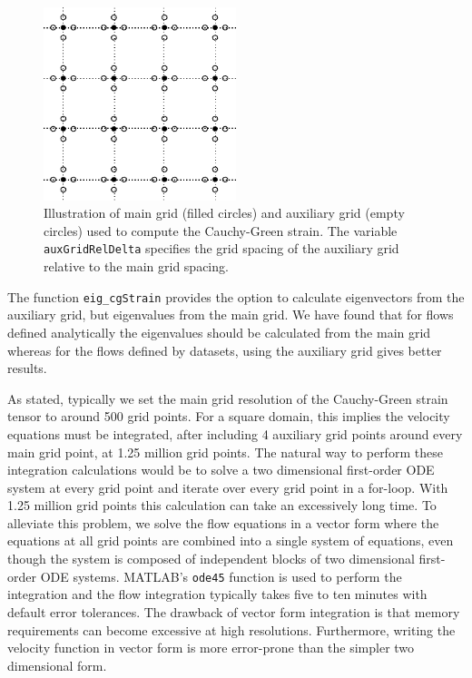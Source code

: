 \documentclass{article}
\begin{document}
\begin{figure}
\begin{center}
\includegraphics[width=0.5\textwidth]{graphics/main_aux_grids}
\end{center}
\caption{Illustration of main grid (filled circles) and auxiliary grid (empty circles) used to compute the Cauchy-Green strain. The variable \lstinline!auxGridRelDelta! specifies the grid spacing of the auxiliary grid relative to the main grid spacing.}
\label{f:main and auxiliary grids}
\end{figure}

The function \lstinline!eig_cgStrain! provides the option to calculate eigenvectors from the auxiliary grid, but eigenvalues from the main grid. We have found that for flows defined analytically the eigenvalues should be calculated from the main grid whereas for the flows defined by datasets, using the auxiliary grid gives better results.

As stated, typically we set the main grid resolution of the Cauchy-Green strain tensor to around 500 grid points. For a square domain, this implies the velocity equations must be integrated, after including 4 auxiliary grid points around every main grid point, at 1.25 million grid points. The natural way to perform these integration calculations would be to solve a two dimensional first-order ODE system at every grid point and iterate over every grid point in a for-loop. With 1.25 million grid points this calculation can take an excessively long time. To alleviate this problem, we solve the flow equations in a vector form where the equations at all grid points are combined into a single system of equations, even though the system is composed of independent blocks of two dimensional first-order ODE systems. MATLAB's \lstinline!ode45! function is used to perform the integration and the flow integration typically takes five to ten minutes with default error tolerances. The drawback of vector form integration is that memory requirements can become excessive at high resolutions. Furthermore, writing the velocity function in vector form is more error-prone than the simpler two dimensional form.
\end{document}
